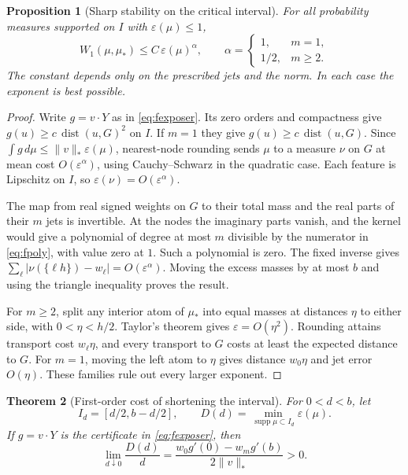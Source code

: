 \documentclass[11pt,letterpaper]{article}
\newtheorem{theorem}{Theorem}[section]
\newtheorem{proposition}[theorem]{Proposition}
\theoremstyle{remark}\newtheorem{remark}[theorem]{Remark}
\begin{document}
\begin{proposition}[Sharp stability on the critical interval]\label{prop:fwasser}
For all probability measures supported on $I$ with $\varepsilon(\mu)\le 1$,
\[
 W_1(\mu,\mu_*)\le C\,\varepsilon(\mu)^\alpha,
 \qquad
 \alpha=\begin{cases}1,&m=1,\\[1mm]1/2,&m\ge2.\end{cases}
\]
The constant depends only on the prescribed jets and the norm. In each case the exponent is best possible.
\end{proposition}

\begin{proof}
Write $g=v\cdot Y$ as in \eqref{eq:fexposer}. Its zero orders and compactness give $g(u)\ge c\,\operatorname{dist}(u,G)^2$ on $I$. If $m=1$ they give $g(u)\ge c\,\operatorname{dist}(u,G)$. Since $\int g\,d\mu\le\|v\|_*\varepsilon(\mu)$, nearest-node rounding sends $\mu$ to a measure $\nu$ on $G$ at mean cost $O(\varepsilon^\alpha)$, using Cauchy--Schwarz in the quadratic case. Each feature is Lipschitz on $I$, so $\varepsilon(\nu)=O(\varepsilon^\alpha)$.

The map from real signed weights on $G$ to their total mass and the real parts of their $m$ jets is invertible. At the nodes the imaginary parts vanish, and the kernel would give a polynomial of degree at most $m$ divisible by the numerator in \eqref{eq:fpoly}, with value zero at $1$. Such a polynomial is zero. The fixed inverse gives $\sum_\ell |\nu(\{\ell h\})-w_\ell|=O(\varepsilon^\alpha)$. Moving the excess masses by at most $b$ and using the triangle inequality proves the result.

For $m\ge2$, split any interior atom of $\mu_*$ into equal masses at distances $\eta$ to either side, with $0<\eta<h/2$. Taylor's theorem gives $\varepsilon=O(\eta^2)$. Rounding attains transport cost $w_\ell\eta$, and every transport to $G$ costs at least the expected distance to $G$. For $m=1$, moving the left atom to $\eta$ gives distance $w_0\eta$ and jet error $O(\eta)$. These families rule out every larger exponent.
\end{proof}

\begin{theorem}[First-order cost of shortening the interval]\label{thm:fleak}
For $0<d<b$, let
\[
 I_d=[d/2,b-d/2],\qquad D(d)=\min_{\operatorname{supp}\mu\subset I_d}\varepsilon(\mu).
\]
If $g=v\cdot Y$ is the certificate in \eqref{eq:fexposer}, then
\begin{equation}\label{eq:fleak}
 \lim_{d\downarrow0}\frac{D(d)}d
   =\frac{w_0g'(0)-w_mg'(b)}{2\|v\|_*}>0 .
\end{equation}
\end{theorem}
\end{document}
